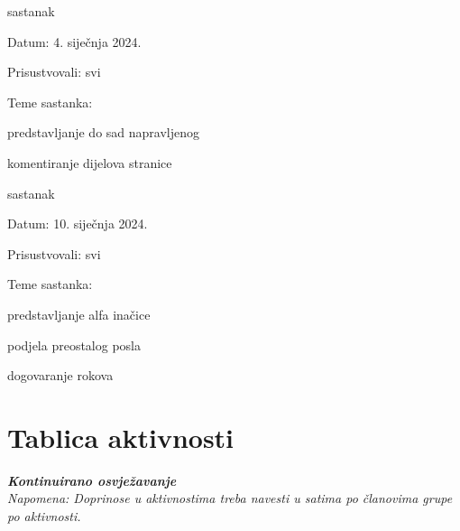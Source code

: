 \begin{packed_enum}
			\item  sastanak			
			\item[] \begin{packed_item}
				\item Datum: 4. siječnja 2024.
				\item Prisustvovali: svi
				\item Teme sastanka:
				\begin{packed_item}
					\item  predstavljanje do sad napravljenog
					\item  komentiranje dijelova stranice
				\end{packed_item}
			\end{packed_item}
			
			\item  sastanak			
			\item[] \begin{packed_item}
				\item Datum: 10. siječnja 2024.
				\item Prisustvovali: svi
				\item Teme sastanka:
				\begin{packed_item}
					\item  predstavljanje alfa inačice
					\item  podjela preostalog posla
					\item  dogovaranje rokova
				\end{packed_item}
			\end{packed_item}
			
		\end{packed_enum}
		
		\eject
		\section*{Tablica aktivnosti}
		
			\textbf{\textit{Kontinuirano osvježavanje}}\\
			
			 \textit{Napomena: Doprinose u aktivnostima treba navesti u satima po članovima grupe po aktivnosti.}

